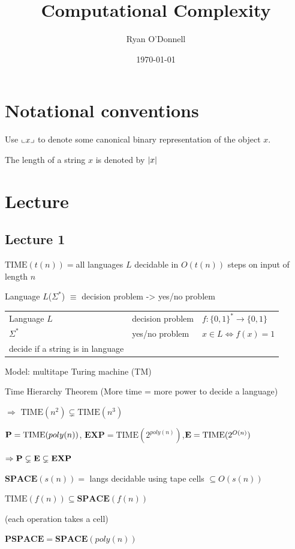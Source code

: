 \documentclass[11pt]{article}
\author{Ryan O'Donnell}
\date{\today}
\title{Computational Complexity}
\def \TIME {\text{TIME}}
\def \EXP {\textbf{EXP}}
\def \SPACE {\textbf{SPACE}}
\def \PSPACE {\textbf{PSPACE}}
\begin{document}
\maketitle
\tableofcontents

\section{Notational conventions}
\label{sec:orgb16dad9}
Use \(\llcorner x \lrcorner\) to denote some canonical binary representation of the object \(x\).

The length of a string \(x\) is denoted by \(\abs{x}\)
\section{Lecture}
\label{sec:org5cd4081}
\subsection{Lecture 1}
\label{sec:orgf346046}
\(\TIME(t(n))=\)all languages \(L\) decidable in \(O(t(n))\) steps on input of length \(n\)

Language \(L\)(\(\Sigma^*\)) \(\equiv\) decision problem -> yes/no problem

\begin{center}
\begin{tabular}{lll}
Language \(L\) & decision problem & \(f:\{0,1\}^*\to\{0,1\}\)\\
\(\Sigma^*\) & yes/no problem & \(x\in L\Leftrightarrow f(x)=1\)\\
decide if a string is in language &  & \\
\end{tabular}
\end{center}

Model: multitape Turing machine (TM)

Time Hierarchy Theorem (More time = more power to decide a language)

\(\Rightarrow\) \(\TIME(n^2)\subsetneq\TIME(n^3)\)

\(\bP=\TIME(poly(n))\), \(\EXP=\TIME(2^{poly(n)})\),\(\bE=\TIME(2^{O(n)})\)

\(\Rightarrow\bP\subsetneq\bE\subsetneq\EXP\)

\(\SPACE(s(n))=\) langs decidable using tape cells \(\subseteq O(s(n))\)

\(\TIME(f(n))\subseteq\SPACE(f(n))\)

(each operation takes a cell)

\(\PSPACE=\SPACE(poly(n))\)
\end{document}
